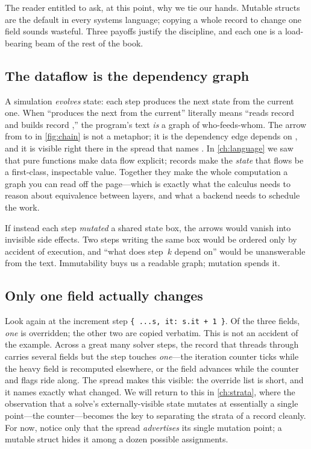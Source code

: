 The reader entitled to ask, at this point, why we tie our hands. Mutable structs
are the default in every systems language; copying a whole record to change one
field sounds wasteful. Three payoffs justify the discipline, and each one is a
load-bearing beam of the rest of the book.

\subsection{The dataflow is the dependency graph}

A simulation \emph{evolves} state: each step produces the next state from the
current one. When ``produces the next from the current'' literally means ``reads
record  and builds record ,'' the program's text \emph{is} a
graph of who-feeds-whom. The arrow from  to  in
\cref{fig:chain} is not a metaphor; it is the dependency edge  depends
on , and it is visible right there in the spread that names . In
\cref{ch:language} we saw that pure functions make data flow explicit; records
make the \emph{state} that flows be a first-class, inspectable value. Together
they make the whole computation a graph you can read off the page---which is
exactly what the calculus needs to reason about equivalence between layers, and
what a backend needs to schedule the work.

If instead each step \emph{mutated} a shared state box, the arrows would
vanish into invisible side effects. Two steps writing the same box would be
ordered only by accident of execution, and ``what does step~$k$ depend on'' would
be unanswerable from the text. Immutability buys us a readable graph; mutation
spends it.

\subsection{Only one field actually changes}

Look again at the increment step \lstinline[style=l4style]|{ ...s, it: s.it + 1 }|.
Of the three fields, \emph{one} is overridden; the other two are copied verbatim.
This is not an accident of the example. Across a great many solver steps, the
record that threads through carries several fields but the step touches
\emph{one}---the iteration counter ticks while the heavy field is recomputed
elsewhere, or the field advances while the counter and flags ride along. The
spread makes this visible: the override list is short, and it names exactly what
changed. We will return to this in \cref{ch:strata}, where the observation that a
solve's externally-visible state mutates at essentially a single point---the
counter---becomes the key to separating the strata of a record cleanly. For now,
notice only that the spread \emph{advertises} its single mutation point; a
mutable struct hides it among a dozen possible assignments.

